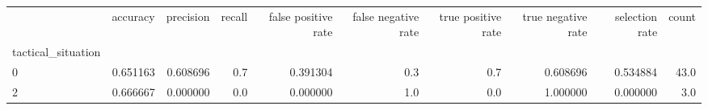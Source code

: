 \begin{tabular}{lrrrrrrrrr}
\toprule
{} &  accuracy &  precision &  recall &  false positive rate &  false negative rate &  true positive rate &  true negative rate &  selection rate &  count \\
tactical\_situation &           &            &         &                      &                      &                     &                     &                 &        \\
\midrule
0                  &  0.651163 &   0.608696 &     0.7 &             0.391304 &                  0.3 &                 0.7 &            0.608696 &        0.534884 &   43.0 \\
2                  &  0.666667 &   0.000000 &     0.0 &             0.000000 &                  1.0 &                 0.0 &            1.000000 &        0.000000 &    3.0 \\
\bottomrule
\end{tabular}
